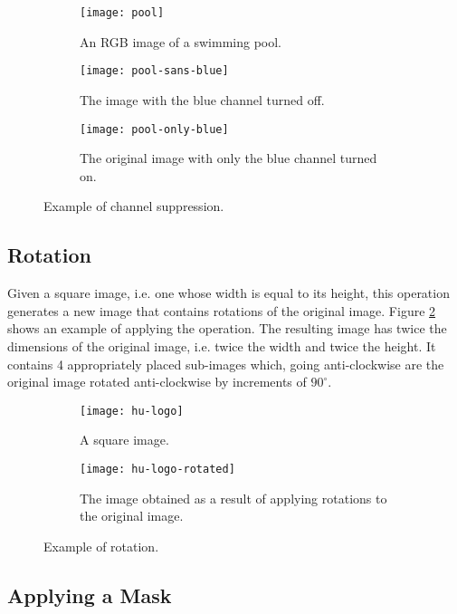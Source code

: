 \documentclass[addpoints]{exam}
\begin{document}
\begin{figure}
  \centering
  \begin{subfigure}{.3\textwidth}
    \texttt{[image: pool]}
    \caption{An RGB image of a swimming pool.}
  \end{subfigure}
  \begin{subfigure}{.3\textwidth}
    \texttt{[image: pool-sans-blue]}
    \caption{The image with the blue channel turned off.}
  \end{subfigure}
  \begin{subfigure}{.3\textwidth}
    \texttt{[image: pool-only-blue]}
    \caption{The original image with only the blue channel turned on.}
  \end{subfigure}
  \caption{Example of channel suppression.}
  \label{fig:channel}
\end{figure}

\subsection{Rotation}

Given a square image, i.e. one whose width is equal to its height, this operation generates a new image that contains rotations of the original image. Figure \ref{fig:rotate} shows an example of applying the operation. The resulting image has twice the dimensions of the original image, i.e. twice the width and twice the height. It contains 4 appropriately placed sub-images which, going anti-clockwise are the original image rotated anti-clockwise by increments of  $90^\circ$.

\begin{figure}
  \centering
  \begin{subfigure}{.2\textwidth}
    \texttt{[image: hu-logo]}
    \caption{A square image.}
  \end{subfigure}
  \begin{subfigure}[c]{.35\textwidth}
    \texttt{[image: hu-logo-rotated]}
    \caption{The image obtained as a result of applying rotations to the original image.}
  \end{subfigure}
  \caption{Example of rotation.}
  \label{fig:rotate}
\end{figure}

\subsection{Applying a Mask}
\end{document}
